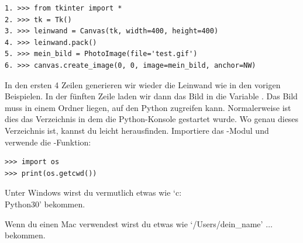 \begin{Verbatim}[frame=single]
1. >>> from tkinter import *
2. >>> tk = Tk()
3. >>> leinwand = Canvas(tk, width=400, height=400)
4. >>> leinwand.pack()
5. >>> mein_bild = PhotoImage(file='test.gif')
6. >>> canvas.create_image(0, 0, image=mein_bild, anchor=NW)
\end{Verbatim}

In den ersten 4 Zeilen generieren wir wieder die Leinwand wie in den vorigen Beispielen. In der fünften Zeile laden wir dann das Bild in die Variable . Das Bild muss in einem Ordner liegen, auf den Python zugreifen kann. Normalerweise ist dies das Verzeichnis in dem die Python-Konsole gestartet wurde. Wo genau dieses Verzeichnis ist, kannst du leicht herausfinden. Importiere das -Modul und verwende die -Funktion: 

\begin{Verbatim}[frame=single]
>>> import os
>>> print(os.getcwd())
\end{Verbatim}

\begin{WINDOWS}
Unter Windows wirst du vermutlich etwas wie `c:\\Python30' bekommen.
\end{WINDOWS}

\begin{MAC}
Wenn du einen Mac verwendest wirst du etwas wie `/Users/dein\_name' $\ldots$ bekommen. 
\end{MAC}

